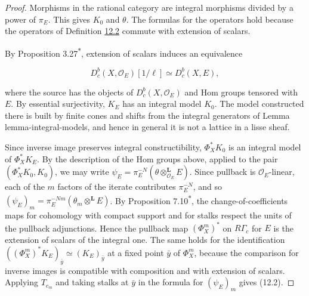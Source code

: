 \documentclass[11pt]{article}
\newcommand{\bpout}[1]{#1\textsuperscript{\hyperlink{bp-outside}{\ensuremath{\ast}}}}
\providecommand{\Dbc}{}\renewcommand{\Dbc}{D^b_c}
\begin{document}
\begin{proof}[{Proof}]\label{bp70}%
Morphisms in the rational category are integral morphisms divided by a power of \(\pi_E\). This gives \(K_0\) and \(\theta\). The formulas for the operators hold because the operators of Definition \hyperref[bp7]{12.2} commute with extension of scalars.

By Proposition \bpout{3.27}, extension of scalars induces an equivalence

\[
\Dbc(X,\mathcal O_E)[1/\ell]\simeq\Dbc(X,E),
\]

where the source has the objects of \(\Dbc(X,\mathcal O_E)\) and Hom groups tensored with \(E\). By essential surjectivity, \(K_E\) has an integral model \(K_0\). The model constructed there is built by finite cones and shifts from the integral generators of Lemma lemma-integral-models, and hence in general it is not a lattice in a lisse sheaf.

Since inverse image preserves integral constructibility, \(\Phi_X^*K_0\) is an integral model of \(\Phi_X^*K_E\). By the description of the Hom groups above, applied to the pair \((\Phi_X^*K_0,K_0)\), we may write \(\psi_E=\pi_E^{-N}(\theta\otimes^{\mathbf L}_{\mathcal O_E}E)\). Since pullback is \(\mathcal O_E\)-linear, each of the \(m\) factors of the iterate contributes \(\pi_E^{-N}\), and so \((\psi_E)_m=\pi_E^{-Nm}(\theta_m\otimes^{\mathbf L} E)\). By Proposition \bpout{7.10}, the change-of-coefficients maps for cohomology with compact support and for stalks respect the units of the pullback adjunctions. Hence the pullback map \((\Phi_X^m)^*\) on \(R\Gamma_c\) for \(E\) is the extension of scalars of the integral one. The same holds for the identification \(((\Phi_X^m)^*K_E)_{\bar y}\simeq (K_E)_{\bar y}\) at a fixed point \(\bar y\) of \(\Phi_X^m\), because the comparison for inverse images is compatible with composition and with extension of scalars. Applying \(T_{c_m}\) and taking stalks at \(\bar y\) in the formula for \((\psi_E)_m\) gives (12.2).
\end{proof}
\end{document}
